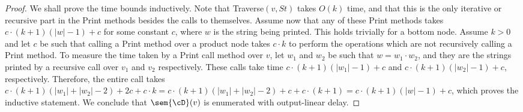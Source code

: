 \begin{proof}
We shall prove the time bounds inductively. Note that {\sc Traverse}$(v, St)$ takes $O(k)$ time, and that this is the only iterative or recursive part in the {\sc Print} methods besides the calls to themselves. Assume now that any of these {\sc Print} methods takes $c\cdot(k+1)(|w| - 1) + c$ for some constant $c$, where $w$ is the string being printed. This holds trivially for a bottom node. Assume $k > 0$ and let $c$ be such that calling a {\sc Print} method over a product node takes $c\cdot k$ to perform the operations which are not recursively calling a {\sc Print} method. To measure the time taken by a {\sc Print} call method over $v$, let $w_1$ and $w_2$ be such that $w = w_1\cdot w_2$, and they are the strings printed by a recursive call over $v_1$ and $v_2$ respectively. These calls take time $c\cdot(k+1)(|w_1| - 1) + c$ and $c\cdot(k+1)(|w_2| - 1) + c$, respectively. Therefore, the entire call takes $c\cdot(k+1)(|w_1| + |w_2| - 2) + 2c + c\cdot k = c\cdot(k+1)(|w_1| + |w_2| - 2) + c + c\cdot(k+1) = c\cdot(k+1)(|w| - 1) + c$, which proves the inductive statement.
We conclude that $\sem{\cD}(v)$ is enumerated with output-linear delay.


\end{proof}
